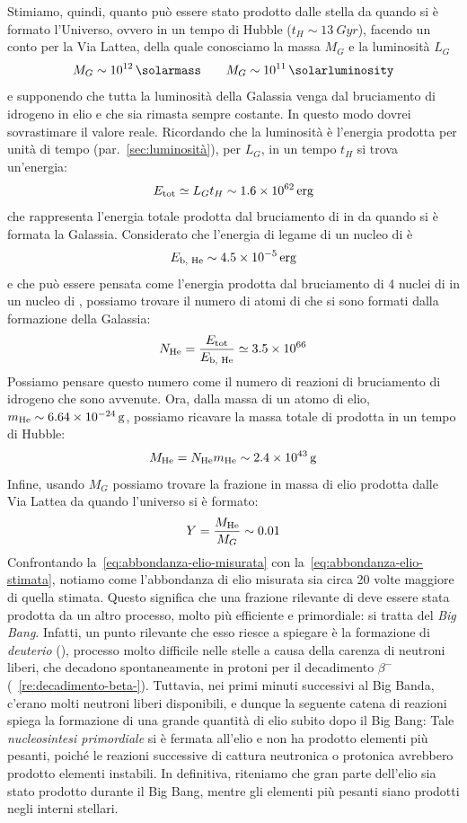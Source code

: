 Stimiamo, quindi, quanto  può essere stato prodotto dalle stella da quando si è formato l'Universo, ovvero in un tempo di Hubble ($t_H \sim \SI{13}{Gyr}$), facendo un conto per la Via Lattea, della quale conosciamo la massa $M_G$ e la luminosità $L_G$
\[
M_G \sim \SI{e12}{\solarmass} \qquad M_G \sim \SI{e11}{\solarluminosity}
\]
e supponendo che tutta la luminosità della Galassia venga dal bruciamento di idrogeno in elio e che sia rimasta sempre costante. In questo modo dovrei sovrastimare il valore reale. Ricordando che la luminosità è l'energia prodotta per unità di tempo (par.~\ref{sec:luminosità}), per $L_G$, in un tempo $t_H$ si trova un'energia:
\[
E_\textup{tot} \simeq L_G t_H \sim \SI{1.6e62}{erg}
\]
che rappresenta l'energia totale prodotta dal bruciamento di  in  da quando si è formata la Galassia. Considerato che l'energia di legame di un nucleo di  è
\[
E_\textup{b, He} \sim \SI{4.5e-5}{erg}
\]
e che può essere pensata come l'energia prodotta dal bruciamento di 4 nuclei di  in un nucleo di , possiamo trovare il numero di atomi di  che si sono formati dalla formazione della Galassia:
\[
N_\textup{He} = \frac{E_\textup{tot}}{E_\textup{b, He}} \simeq \SI{3.5e66}{}
\]
Possiamo pensare questo numero come il numero di reazioni di bruciamento di idrogeno che sono avvenute. Ora, dalla massa di un atomo di elio, $m_\textup{He} \sim \SI{6.64e-24}{g}$, possiamo ricavare la massa totale di  prodotta in un tempo di Hubble:
\[
M_\textup{He} = N_\textup{He} m_\textup{He} \sim \SI{2.4e43}{g}
\]
Infine, usando $M_G$ possiamo trovare la frazione in massa di elio prodotta dalle Via Lattea da quando l'universo si è formato:
\begin{equation}\label{eq:abbondanza-elio-stimata}
Y = \frac{M_\textup{He}}{M_G} \sim 0.01
\end{equation}
Confrontando la~\eqref{eq:abbondanza-elio-misurata} con la~\eqref{eq:abbondanza-elio-stimata}, notiamo come l'abbondanza di elio misurata sia circa 20 volte maggiore di quella stimata. Questo significa che una frazione rilevante di  deve essere stata prodotta da un altro processo, molto più efficiente e primordiale: si tratta del \emph{Big Bang}. Infatti, un punto rilevante che esso riesce a spiegare è la formazione di \emph{deuterio} (), processo molto difficile nelle stelle a causa della carenza di neutroni liberi, che decadono spontaneamente in protoni per il decadimento $\beta^-$ (~\ref{re:decadimento-beta-}). Tuttavia, nei primi minuti successivi al Big Banda, c'erano molti neutroni liberi disponibili, e dunque la seguente catena di reazioni spiega la formazione di una grande quantità di elio subito dopo il Big Bang:
Tale \emph{nucleosintesi primordiale} si è fermata all'elio e non ha prodotto elementi più pesanti, poiché le reazioni successive di cattura neutronica o protonica avrebbero prodotto elementi instabili. In definitiva, riteniamo che gran parte dell'elio sia stato prodotto durante il Big Bang, mentre gli elementi più pesanti siano prodotti negli interni stellari.
 
